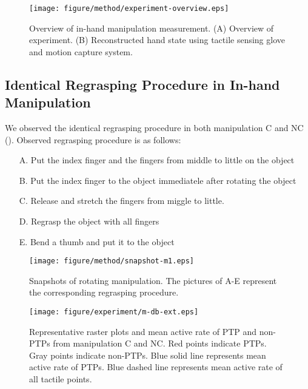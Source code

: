 \documentclass[letterpaper, 10 pt, conference]{IEEEtran}  %
\begin{document}
\begin{figure}[t!]
  \centering
  \texttt{[image: figure/method/experiment-overview.eps]}
  \caption{Overview of in-hand manipulation measurement. (A) Overview of experiment. (B) Reconstructed hand state using tactile sensing glove and motion capture system.}
 \label{fig:experiment-overview}
\end{figure}


\subsection{Identical Regrasping Procedure in In-hand Manipulation}

We observed the identical regrasping procedure in both manipulation C and NC (). Observed regrasping procedure is as follows:
\begin{itemize}
    \item[A.] Put the index finger and the fingers from middle to little on the object
    \item[B.] Put the index finger to the object immediatele after rotating the object
    \item[C.] Release and stretch the fingers from miggle to little.
    \item[D.] Regrasp the object with all fingers
    \item[E.] Bend a thumb and put it to the object
\end{itemize}

\begin{figure*}[t!]
  \centering
  \texttt{[image: figure/method/snapshot-m1.eps]}
  \caption{Snapshots of rotating manipulation. The pictures of A-E represent the corresponding regrasping procedure.}
 \label{fig:snapshot}
\end{figure*}

\begin{figure*}[t!]
 \centering
  \texttt{[image: figure/experiment/m-db-ext.eps]}
  \caption{Representative raster plots and mean active rate of PTP and non-PTPs from manipulation C and NC. Red points indicate PTPs. Gray points indicate non-PTPs. Blue solid line represents mean active rate of PTPs. Blue dashed line represents mean active rate of all tactile points.}
 \label{fig:m-db-ext}
\end{figure*}
\end{document}
